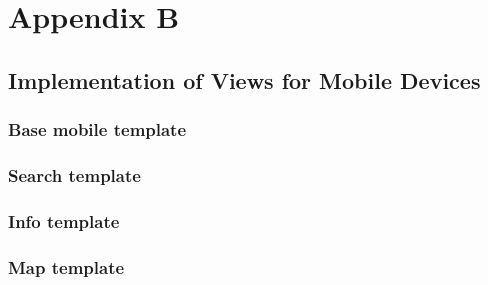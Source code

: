 
\chapter{Appendix B}
\label{app:mobile}

\section{Implementation of Views for Mobile Devices}
\subsection{Base mobile template}


\subsection{Search template}


\subsection{Info template}


\subsection{Map template}




